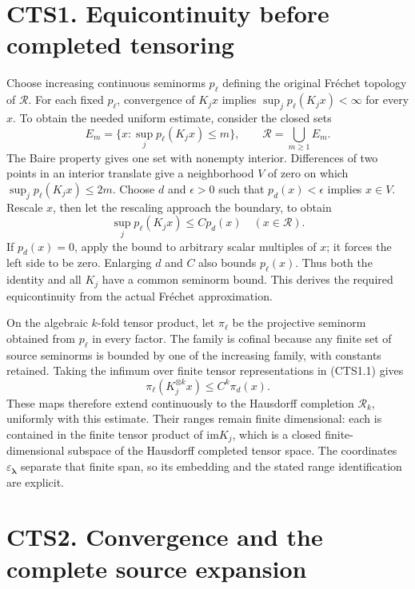 \section{CTS1. Equicontinuity before completed
tensoring}\label{cts1.-equicontinuity-before-completed-tensoring}

Choose increasing continuous seminorms \(p_\ell\) defining the original
Fréchet topology of \(\mathcal R\). For each fixed \(p_\ell\),
convergence of \(K_jx\) implies \(\sup_jp_\ell(K_jx)<\infty\) for every
\(x\). To obtain the needed uniform estimate, consider the closed sets
\[
E_m=\{x:\sup_jp_\ell(K_jx)\le m\},\qquad \mathcal R=\bigcup_{m\ge1}E_m.
\] The Baire property gives one set with nonempty interior. Differences
of two points in an interior translate give a neighborhood \(V\) of zero
on which \(\sup_jp_\ell(K_jx)\le2m\). Choose \(d\) and \(\epsilon>0\)
such that \(p_d(x)<\epsilon\) implies \(x\in V\). Rescale \(x\), then
let the rescaling approach the boundary, to obtain \[
\sup_jp_\ell(K_jx)\le C p_d(x)\quad(x\in\mathcal R).
\tag{CTS1.1}
\] If \(p_d(x)=0\), apply the bound to arbitrary scalar multiples of
\(x\); it forces the left side to be zero. Enlarging \(d\) and \(C\)
also bounds \(p_\ell(x)\). Thus both the identity and all \(K_j\) have a
common seminorm bound. This derives the required equicontinuity from the
actual Fréchet approximation.

On the algebraic \(k\)-fold tensor product, let \(\pi_\ell\) be the
projective seminorm obtained from \(p_\ell\) in every factor. The family
is cofinal because any finite set of source seminorms is bounded by one
of the increasing family, with constants retained. Taking the infimum
over finite tensor representations in (CTS1.1) gives \[
\pi_\ell(K_j^{\otimes k}x)\le C^k\pi_d(x).
\tag{CTS1.2}
\] These maps therefore extend continuously to the Hausdorff completion
\(\mathscr R_k\), uniformly with this estimate. Their ranges remain
finite dimensional: each is contained in the finite tensor product of
\(\mathrm{im}K_j\), which is a closed finite-dimensional subspace of the
Hausdorff completed tensor space. The coordinates
\(\varepsilon_{\boldsymbol\lambda}\) separate that finite span, so its
embedding and the stated range identification are explicit.

\section{CTS2. Convergence and the complete source
expansion}\label{cts2.-convergence-and-the-complete-source-expansion}

